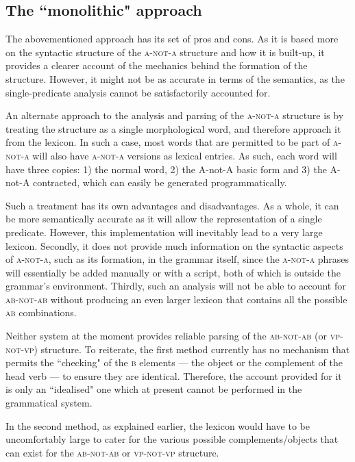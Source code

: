 \documentclass[12pt, UTF8]{article}
\begin{document}

\subsection{The ``monolithic" approach}

The abovementioned approach has its set of pros and cons. As it is based more on the syntactic structure of the \textsc{a-not-a} structure and how it is built-up, it provides a clearer account of the mechanics behind the formation of the structure. However, it might not be as accurate in terms of the semantics, as the single-predicate analysis cannot be satisfactorily accounted for.

An alternate approach to the analysis and parsing of the \textsc{a-not-a} structure is by treating the structure as a single morphological word, and therefore approach it from the lexicon. In such a case, most words that are permitted to be part of \textsc{a-not-a} will also have \textsc{a-not-a} versions as lexical entries. As such, each word will have three copies: 1) the normal word, 2) the A-not-A basic form and 3) the A-not-A contracted, which can easily be generated programmatically.

Such a treatment has its own advantages and disadvantages. As a whole, it can be more semantically accurate as it will allow the representation of a single predicate. However, this implementation will inevitably lead to a very large lexicon. Secondly, it does not provide much information on the syntactic aspects of \textsc{a-not-a}, such as its formation, in the grammar itself, since the \textsc{a-not-a} phrases will essentially be added manually or with a script, both of which is outside the grammar's environment. Thirdly, such an analysis will not be able to account for \textsc{ab-not-ab} without producing an even larger lexicon that contains all the possible \textsc{ab} combinations.

Neither system at the moment provides reliable parsing of the \textsc{ab-not-ab} (or \textsc{vp-not-vp}) structure. To reiterate, the first method currently has no mechanism that permits the ``checking" of the \textsc{b} elements --- the object or the complement of the head verb --- to ensure they are identical. Therefore, the account provided for it is only an ``idealised" one which at present cannot be performed in the grammatical system.

In the second method, as explained earlier, the lexicon would have to be uncomfortably large to cater for the various possible complements/objects that can exist for the \textsc{ab-not-ab} or \textsc{vp-not-vp} structure.  
\end{document}
